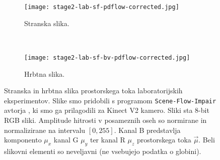 \begin{figure}[!htb]
	\centering
	\begin{subfigure}[t]{0.45\columnwidth}
		\centering
		\texttt{[image: stage2-lab-sf-pdflow-corrected.jpg]}
		\caption{Stranska slika.}
	\end{subfigure}
	~
	\begin{subfigure}[t]{0.45\columnwidth}
		\centering
		\texttt{[image: stage2-lab-sf-bv-pdflow-corrected.jpg]}
		\caption{Hrbtna slika.}
	\end{subfigure}
	\caption[Stranska in hrbtna slika prostorskega toka lab. eksperimentov]{Stranska in hrbtna slika prostorskega toka laboratorijskih eksperimentov. Slike smo pridobili s programom \texttt{Scene-Flow-Impair} avtorja \cite{jaimez2015primal}, ki smo ga prilagodili za Kinect V2 kamero. Sliki sta 8-bit RGB sliki. Amplitude hitrosti v posameznih oseh so normirane in normalizirane na intervalu $[0,255]$. Kanal B predstavlja komponento $\mu_x$ kanal G $\mu_y$ ter kanal R $\mu_z$ prostorskega toka $\vec{\mu}$. Beli slikovni elementi so neveljavni (ne vsebujejo podatka o globini).}
	\label{fig:stage2-lab-sf-pd}
\end{figure}

